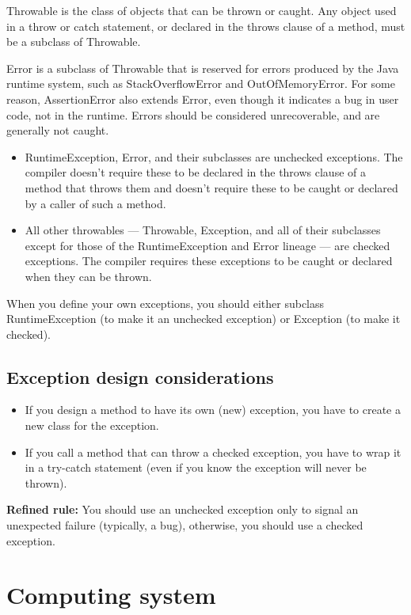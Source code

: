 \documentclass[letterpaper,12pt]{article}
\begin{document}
Throwable is the class of objects that can be thrown or caught. Any object used
in a throw or catch statement, or declared in the throws clause of a method,
must be a subclass of Throwable.

Error is a subclass of Throwable that is reserved for errors produced by the
Java runtime system, such as StackOverflow­Error and OutOfMemory­Error. For
some reason, Assertion­Error also extends Error, even though it indicates a bug
in user code, not in the runtime. Errors should be considered unrecoverable,
and are generally not caught.

\begin{itemize}
      \item RuntimeException, Error, and their subclasses are unchecked exceptions. The
            compiler doesn't require these to be declared in the throws clause of a method
            that throws them and doesn't require these to be caught or declared by a
            caller of such a method.
      \item All other throwables — Throwable, Exception, and all of their subclasses except
            for those of the RuntimeException and Error lineage — are checked exceptions.
            The compiler requires these exceptions to be caught or declared when they can be thrown.
\end{itemize}
When you define your own exceptions, you should either subclass RuntimeException (to make it an unchecked exception) or Exception (to make it checked).
\subsection{Exception design considerations}
\begin{itemize}
      \item If you design a method to have its own (new) exception, you have to create a
            new class for the exception.
      \item If you call a method that can throw a checked exception, you have to wrap it in
            a try-catch statement (even if you know the exception will never be thrown).
\end{itemize}
\textbf{Refined rule: }
You should use an unchecked exception only to signal an unexpected failure (typically, a bug), otherwise, you should use a checked exception.

\section{Computing system}
\end{document}
